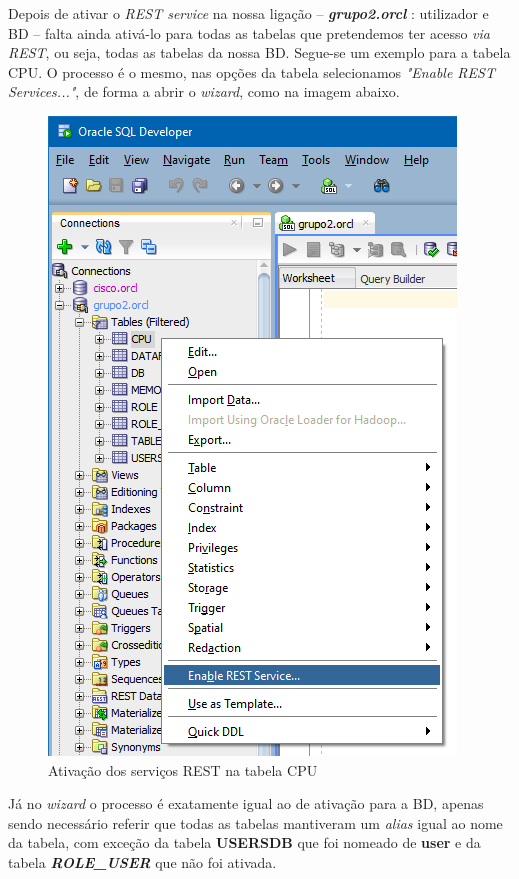 \documentclass[a4paper]{article}
\begin{document}
Depois de ativar o \emph{REST service} na nossa ligação -- \emph{\textbf{grupo2.orcl}} : utilizador e BD --  falta ainda ativá-lo para todas as tabelas que pretendemos ter acesso \emph{via REST}, ou seja, todas as tabelas da nossa BD.
Segue-se um exemplo para a tabela CPU. O processo é o mesmo, nas opções da tabela selecionamos \emph{"Enable REST Services..."}, de forma a abrir o \emph{wizard}, como na imagem abaixo.

\begin{figure}[H]
\centering
\includegraphics[scale=0.6]{REST/rest_tabela_1.png}
\caption{Ativação dos serviços REST na tabela CPU}
\end{figure}

Já no \emph{wizard} o processo é exatamente igual ao de ativação para a BD, apenas sendo necessário referir que todas as tabelas mantiveram um \emph{alias} igual ao nome da tabela, com exceção da tabela \textbf{USERSDB} que foi nomeado de \textbf{user} e da tabela  \emph{\textbf{ROLE\_USER}} que não foi ativada.\\
\end{document}
